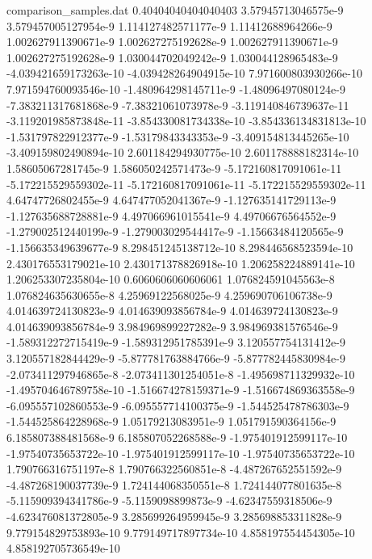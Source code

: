 \begin{filecontents}{comparison_samples.dat}
0.40404040404040403 3.57945713046575e-9     3.579457005127954e-9    1.114127482571177e-9   1.11412688964266e-9    1.002627911390671e-9   1.002627275192628e-9   1.002627911390671e-9   1.002627275192628e-9   1.030044702049242e-9   1.030044128965483e-9   -4.039421659173263e-10  -4.039428264904915e-10  7.971600803930266e-10  7.971594760093546e-10  -1.480964298145711e-9   -1.48096497080124e-9    -7.383211317681868e-9   -7.38321061073978e-9    -3.119140846739637e-11  -3.119201985873848e-11  -3.854330081734338e-10  -3.854336134831813e-10  -1.531797822912377e-9   -1.53179843343353e-9    -3.409154813445265e-10  -3.409159802490894e-10  2.601184294930775e-10  2.601178888182314e-10  1.58605067281745e-9    1.586050242571473e-9   -5.172160817091061e-11  -5.172215529559302e-11  -5.172160817091061e-11  -5.172215529559302e-11  4.64747726802455e-9    4.647477052041367e-9   -1.127635141729113e-9   -1.127635688728881e-9   4.497066961015541e-9   4.49706676564552e-9    -1.279002512440199e-9   -1.279003029544417e-9   -1.15663484120565e-9    -1.156635349639677e-9   8.298451245138712e-10  8.298446568523594e-10  2.430176553179021e-10  2.430171378826918e-10  1.206258224889141e-10   1.206253307235804e-10 
0.6060606060606061  1.076824591045563e-8    1.076824635630655e-8    4.25969122568025e-9    4.259690706106738e-9   4.014639724130823e-9   4.014639093856784e-9   4.014639724130823e-9   4.014639093856784e-9   3.984969899227282e-9   3.984969381576546e-9   -1.589312272715419e-9   -1.589312951785391e-9   3.120557754131412e-9   3.120557182844429e-9   -5.877781763884766e-9   -5.877782445830984e-9   -2.073411297946865e-8   -2.073411301254051e-8   -1.495698711329932e-10  -1.495704646789758e-10  -1.516674278159371e-9   -1.516674869363558e-9   -6.095557102860553e-9   -6.095557714100375e-9   -1.544525478786303e-9   -1.544525864228968e-9   1.05179213083951e-9    1.051791590364156e-9   6.185807388481568e-9   6.185807052268588e-9   -1.975401912599117e-10  -1.97540735653722e-10   -1.975401912599117e-10  -1.97540735653722e-10   1.790766316751197e-8   1.790766322560851e-8   -4.487267652551592e-9   -4.487268190037739e-9   1.724144068350551e-8   1.724144077801635e-8   -5.115909394341786e-9   -5.1159098899873e-9     -4.62347559318506e-9    -4.623476081372805e-9   3.285699264959945e-9   3.285698853311828e-9   9.779154829753893e-10  9.779149717897734e-10  4.858197554454305e-10   4.858192705736549e-10 

\end{filecontents}
